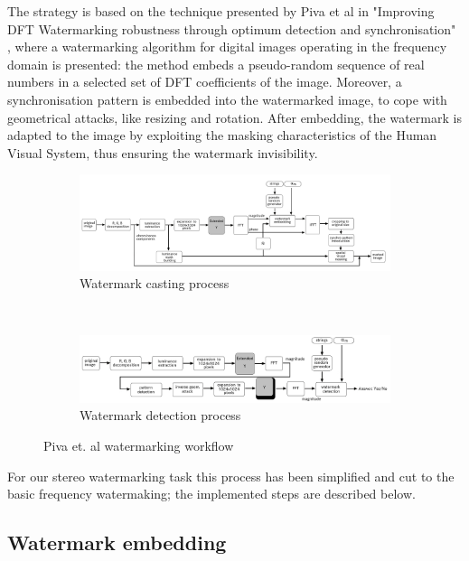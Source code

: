 The strategy is based on the technique presented by Piva et al in "Improving DFT Watermarking robustness through optimum detection and synchronisation" \cite{PIVA}, where a watermarking algorithm for digital images operating in the frequency domain is presented: the method embeds a pseudo-random sequence of real numbers in a selected set of DFT coefficients of the image. Moreover, a synchronisation pattern is embedded into the watermarked image, to cope with geometrical attacks, like resizing and rotation. After embedding, the watermark is adapted to the image by exploiting the masking characteristics of the Human Visual System, thus ensuring the watermark invisibility.\newline
\begin{figure}[h!]
\centering
\begin{subfigure}[]{\textwidth}
\centering
\includegraphics[width=1\textwidth]{./img/casting.png}
\caption{\scriptsize{Watermark casting process}\label{fig:cast}}
\end{subfigure} 
~\quad
\begin{subfigure}[]{\textwidth}
\centering
\includegraphics[width=1\textwidth]{./img/detection.png}
\caption{\scriptsize{Watermark detection process}\label{fig:det}}
\end{subfigure}%
\caption{\small{Piva et. al watermarking workflow}\label{fig:blocchi}}
\end{figure}

For our stereo watermarking task this process has been simplified and cut to the basic frequency watermaking; the implemented steps are described below.

\subsection{Watermark embedding} 
\label{wat_emb}

